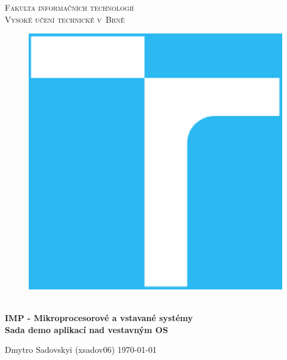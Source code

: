 \documentclass[11pt,a4paper]{article}
\begin{document}

\begin{titlepage}
    \begin{center}
        \Huge
        \textsc{
            Fakulta informačních technologií\\
            Vysoké učení technické v~Brně
        }
        \vspace{100px}
        \begin{figure}[!h]
            \centering
            \includegraphics[scale=0.3]{img/vutbr-fit-logo.eps}
        \end{figure}
        \\[20mm]
        \huge{
            \textbf{
                IMP - Mikroprocesorové a vstavané systémy
            }
        }
        \\[2em]
        \LARGE{
            \textbf{
                Sada demo aplikací nad vestavným OS
            }
        }
        \vfill
    \end{center}
        \Large{
            Dmytro Sadovskyi (xsadov06) \hfill \today
        }

\end{titlepage}

\end{document}
